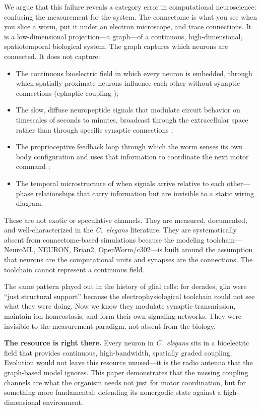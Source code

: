 \documentclass[12pt]{article}
\begin{document}
We argue that this failure reveals a category error in computational neuroscience: confusing the measurement for the system. The connectome is what you see when you slice a worm, put it under an electron microscope, and trace connections. It is a low-dimensional projection---a graph---of a continuous, high-dimensional, spatiotemporal biological system. The graph captures which neurons are connected. It does not capture:

\begin{itemize}
\item The continuous bioelectric field in which every neuron is embedded, through which spatially proximate neurons influence each other without synaptic connections (ephaptic coupling \cite{pinotsis2023,anastassiou2011});
\item The slow, diffuse neuropeptide signals that modulate circuit behavior on timescales of seconds to minutes, broadcast through the extracellular space rather than through specific synaptic connections \cite{bentley2016};
\item The proprioceptive feedback loop through which the worm senses its own body configuration and uses that information to coordinate the next motor command \cite{wen2012};
\item The temporal microstructure of when signals arrive relative to each other---phase relationships that carry information but are invisible to a static wiring diagram.
\end{itemize}

\noindent These are not exotic or speculative channels. They are measured, documented, and well-characterized in the \textit{C.~elegans} literature. They are systematically absent from connectome-based simulations because the modeling toolchain---NeuroML, NEURON, Brian2, OpenWorm/c302---is built around the assumption that neurons are the computational units and synapses are the connections. The toolchain cannot represent a continuous field.

The same pattern played out in the history of glial cells: for decades, glia were ``just structural support'' because the electrophysiological toolchain could not see what they were doing. Now we know they modulate synaptic transmission, maintain ion homeostasis, and form their own signaling networks. They were invisible to the measurement paradigm, not absent from the biology.

\textbf{The resource is right there.} Every neuron in \textit{C.~elegans} sits in a bioelectric field that provides continuous, high-bandwidth, spatially graded coupling. Evolution would not leave this resource unused---it is the radio antenna that the graph-based model ignores. This paper demonstrates that the missing coupling channels are what the organism needs not just for motor coordination, but for something more fundamental: defending its nonergodic state against a high-dimensional environment.
\end{document}
